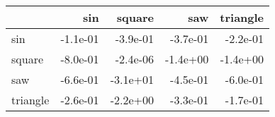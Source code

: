 \begin{tabular}{lrrrr}
\toprule
{} &      sin &   square &      saw &  triangle \\
\midrule
sin      & -1.1e-01 & -3.9e-01 & -3.7e-01 &  -2.2e-01 \\
square   & -8.0e-01 & -2.4e-06 & -1.4e+00 &  -1.4e+00 \\
saw      & -6.6e-01 & -3.1e+01 & -4.5e-01 &  -6.0e-01 \\
triangle & -2.6e-01 & -2.2e+00 & -3.3e-01 &  -1.7e-01 \\
\bottomrule
\end{tabular}
